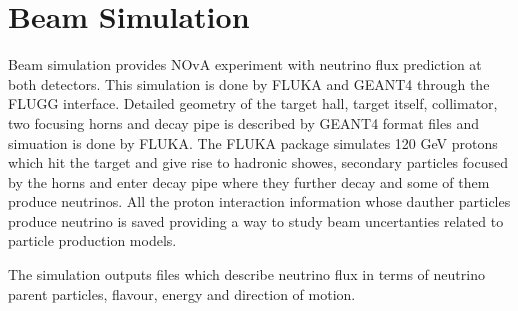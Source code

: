 \section{Beam Simulation}
Beam simulation provides NOvA experiment with neutrino flux prediction at both detectors. 
This simulation is done by FLUKA and GEANT4 through the FLUGG interface. Detailed geometry of
the target hall, target itself, collimator, two focusing horns and decay pipe is described by
GEANT4 format files and simuation is done by FLUKA. The FLUKA package simulates 120 GeV protons
which hit the target and give rise to hadronic showes, secondary particles focused by the horns 
and enter decay pipe where they further decay and some of them produce neutrinos. All the proton 
interaction information whose dauther particles produce neutrino is saved providing a way to 
study beam uncertanties related to particle production models. 

The simulation outputs files which describe neutrino flux in terms of neutrino parent particles, 
flavour, energy and direction of motion.

